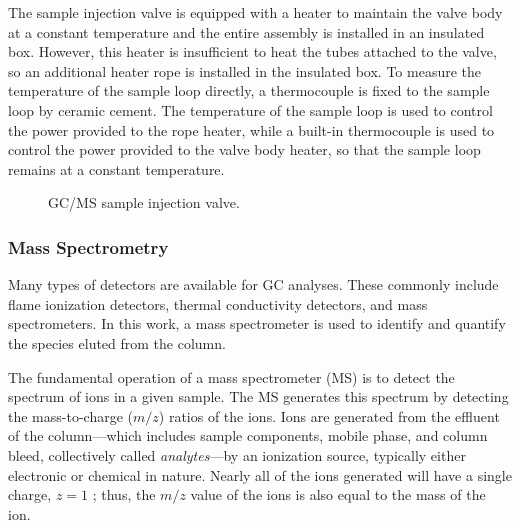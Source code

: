 \documentclass[../main.tex]{subfiles}
\begin{document}
The sample injection valve is equipped with a heater to maintain
the valve body at a constant temperature and the entire assembly is installed
in an insulated box. However, this heater is insufficient
to heat the tubes attached to the valve, so an additional heater rope is installed
in the insulated box. To measure the temperature of the sample loop directly, a thermocouple
is fixed to the sample loop by ceramic cement. The temperature of the
sample loop is used to control the power provided to the rope heater,
while a built-in thermocouple is used to control the power provided
to the valve body heater, so that the sample loop remains at a constant temperature.

\begin{figure}
        {\caption{GC/MS sample injection valve.}
        \label{fig:gcms-valve}}
\end{figure}

\subsubsection{Mass Spectrometry}

Many types of detectors are available for GC analyses. These commonly include
flame ionization detectors, thermal conductivity detectors, and mass
spectrometers. In this work, a mass spectrometer is used to identify and
quantify the species eluted from the column.

The fundamental operation of a mass spectrometer (MS) is to detect the spectrum
of ions in a given sample. The MS generates this spectrum by detecting the
mass-to-charge ($m/z$) ratios of the ions. Ions are generated
from the effluent of the column---which includes sample components, mobile phase,
and column bleed, collectively called \textit{analytes}---by an ionization source,
typically either electronic or chemical in nature. Nearly all of the ions
generated will have a single charge, $z=1$ \cite{Sparkman2011}; thus,
the $m/z$ value of the ions is also equal to the mass of the ion.
\end{document}
